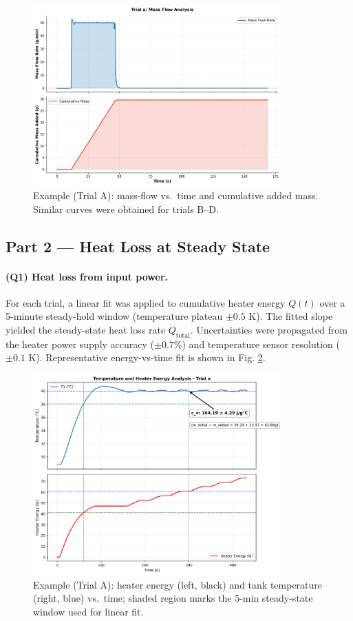 \documentclass[12pt]{article}
\begin{document}
\begin{figure}[H]
\centering
\includegraphics[width=0.85\textwidth]{graphs/part1_trial_a_mass_flow.png}
\caption{Example (Trial A): mass-flow vs.\ time and cumulative added mass. Similar curves were obtained for trials B--D.}
\label{fig:part1_massflow}
\end{figure}

\subsection*{Part 2 — Heat Loss at Steady State}
\paragraph{(Q1) Heat loss from input power.} For each trial, a linear fit was applied to cumulative heater energy $Q(t)$ over a 5-minute steady-hold window (temperature plateau $\pm 0.5$ K). The fitted slope yielded the steady-state heat loss rate $\dot{Q}_{\text{total}}$. Uncertainties were propagated from the heater power supply accuracy ($\pm 0.7$\%) and temperature sensor resolution ($\pm 0.1$ K). Representative energy-vs-time fit is shown in Fig. \ref{fig:part2_energyfit}.

\begin{figure}[H]
\centering
\includegraphics[width=0.85\textwidth]{graphs/part2_trial_a_temp_heater_energy.png}
\caption{Example (Trial A): heater energy (left, black) and tank temperature (right, blue) vs.\ time; shaded region marks the 5-min steady-state window used for linear fit.}
\label{fig:part2_energyfit}
\end{figure}
\end{document}
